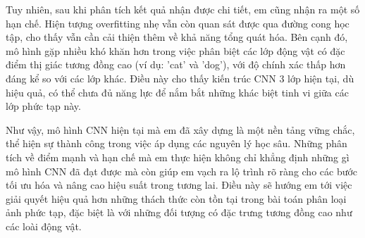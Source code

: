 \documentclass[12pt, a4paper, openany]{report}
\begin{document}
Tuy nhiên, sau khi phân tích kết quả nhận được chi tiết, em cũng nhận ra một số hạn chế. Hiện tượng overfitting nhẹ vẫn còn quan sát được qua đường cong học tập, cho thấy vẫn cần cải thiện thêm về khả năng tổng quát hóa. Bên cạnh đó, mô hình gặp nhiều khó khăn hơn trong việc phân biệt các lớp động vật có đặc điểm thị giác tương đồng cao (ví dụ: 'cat' và 'dog'), với độ chính xác thấp hơn đáng kể so với các lớp khác. Điều này cho thấy kiến trúc CNN 3 lớp hiện tại, dù hiệu quả, có thể chưa đủ năng lực để nắm bắt những khác biệt tinh vi giữa các lớp phức tạp này.

Như vậy, mô hình CNN hiện tại mà em đã xây dựng là một nền tảng vững chắc, thể hiện sự thành công trong việc áp dụng các nguyên lý học sâu. Những phân tích về điểm mạnh và hạn chế mà em thực hiện không chỉ khẳng định những gì mô hình CNN đã đạt được mà còn giúp em vạch ra lộ trình rõ ràng cho các bước tối ưu hóa và nâng cao hiệu suất trong tương lai. Điều này sẽ hướng em tới việc giải quyết hiệu quả hơn những thách thức còn tồn tại trong bài toán phân loại ảnh phức tạp, đặc biệt là với những đối tượng có đặc trưng tương đồng cao như các loài động vật.
\end{document}
